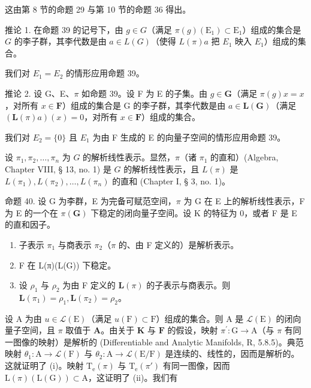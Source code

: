 这由第 8 节的命题 29 与第 10 节的命题 36 得出。

推论 1. 在命题 39 的记号下，由 \(g \in G\)（满足 \(\pi(g)(\mathrm{E}_1) \subset \mathrm{E}_1\)）组成的集合是 \(G\) 的李子群，其李代数是由 \(a \in L(G)\)（使得 \(L(\pi)a\) 把 \(E_1\) 映入 \(E_1\)）组成的集合。

我们对 \(E_{1} = E_{2}\) 的情形应用命题 39。

推论 2. 设 G、E、\(\pi\) 如命题 39。设 F 为 E 的子集。由 \(g \in \mathbf{G}\)（满足 \(\pi(g)x = x\)，对所有 \(x \in \mathbf{F}\)）组成的集合是 G 的李子群，其李代数是由 \(a \in \mathbf{L}(\mathbf{G})\)（满足 \((\mathbf{L}(\pi)a)(x) = 0\)，对所有 \(x \in \mathbf{F}\)）组成的集合。

我们对 \(E_{2}=\{0\}\) 且 \(E_{1}\) 为由 F 生成的 E 的向量子空间的情形应用命题 39。

设 \(\pi_1, \pi_2, \ldots, \pi_n\) 为 \(G\) 的解析线性表示。显然，\(\pi\)（诸 \(\pi_1\) 的直和）(Algebra, Chapter VIII, § 13, no. 1) 是 \(G\) 的解析线性表示，且 \(L(\pi)\) 是 \(L(\pi_1), L(\pi_2), \ldots, L(\pi_n)\) 的直和 (Chapter I, § 3, no. 1)。

命题 40. 设 G 为李群，E 为完备可赋范空间，\(\pi\) 为 G 在 E 上的解析线性表示，F 为 E 的一个在 \(\pi(\mathbf{G})\) 下稳定的闭向量子空间。设 K 的特征为 0，或者 F 是 E 的直和因子。

\begin{enumerate}
\def\labelenumi{(\roman{enumi})}
\item
  子表示 \(\pi_1\) 与商表示 \(\pi_2\)（\(\pi\) 的、由 F 定义的）是解析表示。
\item
  F 在 L(π)(L(G)) 下稳定。
\item
  设 \(\rho_{1}\) 与 \(\rho_{2}\) 为由 F 定义的 \(\mathbf{L}(\pi)\) 的子表示与商表示。则 \(\mathbf{L}(\pi_1) = \rho_1, \mathbf{L}(\pi_2) = \rho_2\)。
\end{enumerate}

设 \(\mathrm{A}\) 为由 \(u\in \mathcal{L}(\mathrm{E})\)（满足 \(u(\mathrm{F})\subset \mathrm{F}\)）组成的集合。则 \(\mathrm{A}\) 是 \(\mathcal{L}(\mathrm{E})\) 的闭向量子空间，且 \(\pi\) 取值于 \(\mathbf{A}\)。由关于 \(\mathbf{K}\) 与 \(\mathbf{F}\) 的假设，映射 \(\pi^{\prime}\colon \mathrm{G}\to \mathrm{A}\)（与 \(\pi\) 有同一图像的映射）是解析的 (Differentiable and Analytic Manifolds, R, 5.8.5)。典范映射 \(\theta_{1}\colon \mathrm{A}\to \mathcal{L}(\mathrm{F})\) 与 \(\theta_{2}\colon \mathrm{A}\to \mathcal{L}(\mathrm{E / F})\) 是连续的、线性的，因而是解析的。这就证明了 (i)。映射 \(\mathrm{T_e}(\pi)\) 与 \(\mathrm{T_e}(\pi ')\) 有同一图像，因而 \(\mathrm{L}(\pi)(\mathrm{L}(\mathrm{G}))\subset \mathrm{A}\)，这证明了 (ii)。我们有

